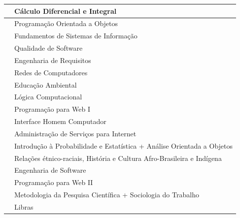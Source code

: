 \documentclass[
	10pt,				%
	openright,			%
	twoside,			%
	a4paper,			%
	english,			%
	french,				%
	brazil,				%
	sumario=tradicional
]{abntex2}
\begin{document}
\begin{table}[]
{\begin{tabular}{@{}l|l@{}}
			\nameref{2_algebra}             & Cálculo Diferencial e Integral                                            \\ \midrule
			\nameref{3_poo}                 & Programação Orientada a Objetos                                           \\
			\nameref{3_nosql}               & Fundamentos de Sistemas de Informação                                     \\			
			\nameref{3_testsoft}            & Qualidade de Software                                                     \\
			\nameref{3_engreq}              & Engenharia de Requisitos                                                  \\
			\nameref{3_redescomp}           & Redes de Computadores                                                     \\
			\nameref{3_educamb}             & Educação Ambiental                                                        \\
			\nameref{3_projamb}             & Lógica Computacional                                                      \\ \midrule
			\nameref{4_ppw1}                & Programação para Web I                                                    \\
			\nameref{4_ihc}                 & Interface Homem Computador                                                \\
			\nameref{4_asi}                 & Administração de Serviços para Internet                                   \\
			\nameref{4_probest}             & Introdução à Probabilidade e Estatística + Análise Orientada a Objetos    \\
			\nameref{4_etnicoraciais}       & Relações étnico-raciais, História e Cultura Afro-Brasileira e Indígena    \\
			\nameref{4_projsoc}             & Engenharia de Software                                                    \\ \midrule			
			\nameref{5_ppw2}                & Programação para Web II                                                   \\
			\nameref{5_metodologia}         & Metodologia da Pesquisa Científica + Sociologia do Trabalho               \\
			\nameref{5_libras}              & Libras                                                                    \\

\end{tabular}}
\end{table}
\end{document}
